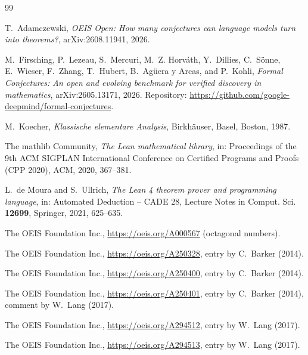 \documentclass[11pt]{amsart}
\theoremstyle{plain}
\theoremstyle{definition}
\begin{document}
\begin{thebibliography}{99}

T.~Adamczewski, \emph{OEIS Open: How many conjectures can language models turn into theorems?}, arXiv:2608.11941, 2026.

M.~Firsching, P.~Lezeau, S.~Mercuri, M.~Z. Horv\'ath, Y.~Dillies, C.~S\"onne, E.~Wieser, F.~Zhang, T.~Hubert, B.~Ag\"uera y Arcas, and P.~Kohli, \emph{Formal Conjectures: An open and evolving benchmark for verified discovery in mathematics}, arXiv:2605.13171, 2026. Repository: \url{https://github.com/google-deepmind/formal-conjectures}.

M.~Koecher, \emph{Klassische elementare Analysis}, Birkh\"auser, Basel, Boston, 1987.

The mathlib Community, \emph{The Lean mathematical library}, in: Proceedings of the 9th ACM SIGPLAN International Conference on Certified Programs and Proofs (CPP 2020), ACM, 2020, 367--381.

L.~de Moura and S.~Ullrich, \emph{The Lean 4 theorem prover and programming language}, in: Automated Deduction -- CADE 28, Lecture Notes in Comput. Sci. \textbf{12699}, Springer, 2021, 625--635.

The OEIS Foundation Inc., \url{https://oeis.org/A000567} (octagonal numbers).

The OEIS Foundation Inc., \url{https://oeis.org/A250328}, entry by C.~Barker (2014).

The OEIS Foundation Inc., \url{https://oeis.org/A250400}, entry by C.~Barker (2014).

The OEIS Foundation Inc., \url{https://oeis.org/A250401}, entry by C.~Barker (2014), comment by W.~Lang (2017).

The OEIS Foundation Inc., \url{https://oeis.org/A294512}, entry by W.~Lang (2017).

The OEIS Foundation Inc., \url{https://oeis.org/A294513}, entry by W.~Lang (2017).

\end{thebibliography}
\end{document}
